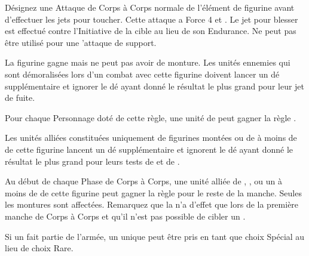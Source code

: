 \armyspecialruleentry{\petrifyingstare}

Désignez une Attaque de Corps à Corps normale de l'élément de figurine avant d'effectuer les jets pour toucher. Cette attaque a Force 4 et . Le jet pour blesser est effectué contre l'Initiative de la cible au lieu de son Endurance. Ne peut pas être utilisé pour une 'attaque de support.

\setlength{\columnseprule}{0.5pt}
\renewcommand{\columnseprulecolor}{\color{black!30}}
\begin{multicols}{2}\raggedcolumns
\armyspecialruleentry{\fleetcommander}

La figurine gagne  mais ne peut pas avoir de monture. Les unités ennemies qui sont démoralisées lors d'un combat avec cette figurine doivent lancer un dé supplémentaire et ignorer le dé ayant donné le résultat le plus grand pour leur jet de fuite.

Pour chaque Personnage doté de cette règle, une unité de \corsairs{} peut gagner la règle \vanguard{}.

\columnbreak
\armyspecialruleentry{\beastmaster}

Les unités alliées constituées uniquement de figurines montées ou de \monsters{} à moins de  de cette figurine lancent un dé supplémentaire et ignorent le dé ayant donné le résultat le plus grand pour leurs tests de \frenzy{} et de \stupidity{}.

Au début de chaque Phase de Corps à Corps, une unité alliée de \cavalry{}, \chariot{}, \monstrouscavalry{} ou un \monster{} à moins de  de cette figurine peut gagner la règle \hatred{} pour le reste de la manche. Seules les montures sont affectées. Remarquez que la \hatred{} n'a d'effet que lors de la première manche de Corps à Corps et qu'il n'est pas possible de cibler un \riddenmonster{}.

Si un \beastmaster{} fait partie de l'armée, un unique \kraken{} peut être pris en tant que choix Spécial au lieu de choix Rare.

\end{multicols}
\setlength{\columnseprule}{0pt}

\closearmyspecialrules





